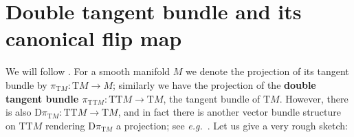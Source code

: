 \documentclass[a4paper,oneside,11pt,bibliography=totoc]{scrartcl}
\renewcommand{\theequation}{\arabic{equation}}
\renewcommand{\listoffigures}{\begingroup
\tocsection
\tocfile{\listfigurename}{lof}
\endgroup}
\renewcommand{\listoftables}{\begingroup
\tocsection
\tocfile{\listtablename}{lot}
\endgroup}
\theoremstyle{plain}
\theoremstyle{remark}
\theoremstyle{definition}
\begin{document}




\appendix
\setcounter{equation}{0}
\renewcommand{\theequation}{\Alph{section}.\arabic{equation}} %

\renewcommand\refname{List of References}






\section{Double tangent bundle and its canonical flip map}\label{DoubleTangentFlip}

We will follow \cite[\S 9.6, page 363]{mackenzieGeneralTheory}. For a smooth manifold $M$ we denote the projection of its tangent bundle by $\pi_{\mathrm{T}M}: \mathrm{T}M \to M$; similarly we have the projection of the \textbf{double tangent bundle $\pi_{\mathrm{TT}M}: \mathrm{TT}M \to \mathrm{T}M$}, the tangent bundle of $\mathrm{T}M$. However, there is also $\mathrm{D}\pi_{\mathrm{T}M}: \mathrm{TT}M \to \mathrm{T}M$, and in fact there is another vector bundle structure on $\mathrm{TT}M$ rendering $\mathrm{D}\pi_{\mathrm{T}M}$ a projection; see \textit{e.g.}\ \cite[\S 3.4 \textit{et seq.}; page 110ff.]{mackenzieGeneralTheory}. Let us give a very rough sketch:
\end{document}
